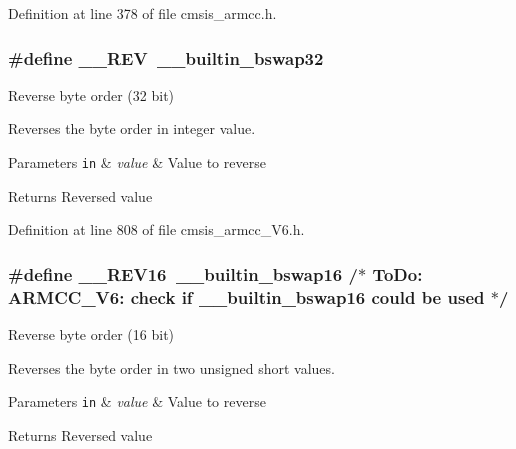 Definition at line 378 of file cmsis\+\_\+armcc.\+h.

\subsubsection[{\texorpdfstring{\+\_\+\+\_\+\+R\+EV}{__REV}}]{\setlength{\rightskip}{0pt plus 5cm}\#define \+\_\+\+\_\+\+R\+EV~\+\_\+\+\_\+builtin\+\_\+bswap32}\hypertarget{group___c_m_s_i_s___core___instruction_interface_ga14f54807872c0f5e05604c4924abfdae}{}\label{group___c_m_s_i_s___core___instruction_interface_ga14f54807872c0f5e05604c4924abfdae}


Reverse byte order (32 bit) 

Reverses the byte order in integer value. 
\begin{DoxyParams}[1]{Parameters}
\mbox{\tt in}  & {\em value} & Value to reverse \\
\hline
\end{DoxyParams}
\begin{DoxyReturn}{Returns}
Reversed value 
\end{DoxyReturn}


Definition at line 808 of file cmsis\+\_\+armcc\+\_\+\+V6.\+h.

\subsubsection[{\texorpdfstring{\+\_\+\+\_\+\+R\+E\+V16}{__REV16}}]{\setlength{\rightskip}{0pt plus 5cm}\#define \+\_\+\+\_\+\+R\+E\+V16~\+\_\+\+\_\+builtin\+\_\+bswap16                           /$\ast$ To\+Do\+:  A\+R\+M\+C\+C\+\_\+\+V6\+: check if \+\_\+\+\_\+builtin\+\_\+bswap16 could be used $\ast$/}\hypertarget{group___c_m_s_i_s___core___instruction_interface_ga4e3acd41e7667cdf65ffcd8c76a8613f}{}\label{group___c_m_s_i_s___core___instruction_interface_ga4e3acd41e7667cdf65ffcd8c76a8613f}


Reverse byte order (16 bit) 

Reverses the byte order in two unsigned short values. 
\begin{DoxyParams}[1]{Parameters}
\mbox{\tt in}  & {\em value} & Value to reverse \\
\hline
\end{DoxyParams}
\begin{DoxyReturn}{Returns}
Reversed value 
\end{DoxyReturn}


